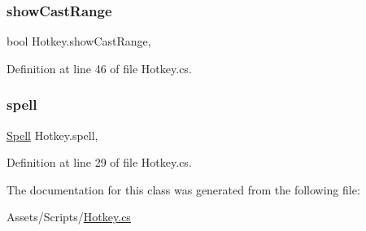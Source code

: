 \subsubsection{\texorpdfstring{showCastRange}{showCastRange}}
{\footnotesize\ttfamily bool Hotkey.\+show\+Cast\+Range\hspace{0.3cm}{\ttfamily [get]}, {\ttfamily [set]}}



Definition at line 46 of file Hotkey.\+cs.

\mbox{\label{class_hotkey_acdccc2b352e81fbc8075f5ddb77cd6df}} 
\subsubsection{\texorpdfstring{spell}{spell}}
{\footnotesize\ttfamily \mbox{\hyperlink{class_spell}{Spell}} Hotkey.\+spell\hspace{0.3cm}{\ttfamily [get]}, {\ttfamily [set]}}



Definition at line 29 of file Hotkey.\+cs.



The documentation for this class was generated from the following file\+:\begin{DoxyCompactItemize}
\item 
Assets/\+Scripts/\mbox{\hyperlink{_hotkey_8cs}{Hotkey.\+cs}}\end{DoxyCompactItemize}
